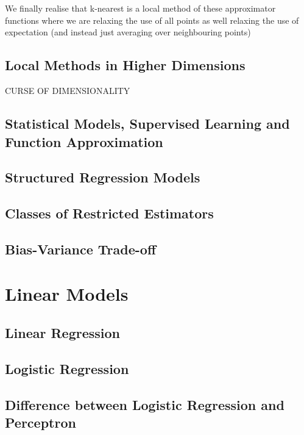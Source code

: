 \documentclass[12pt]{article}
\begin{document}
\\ \\
We finally realise that k-nearest is a local method of these approximator functions where we are relaxing the use of all points as well relaxing the use of expectation (and instead just averaging over neighbouring points) 

\subsection{Local Methods in Higher Dimensions}
CURSE OF DIMENSIONALITY
\subsection{Statistical Models, Supervised Learning and Function Approximation}
\subsection{Structured Regression Models}
\subsection{Classes of Restricted Estimators}
\subsection{Bias-Variance Trade-off}




\newpage 


\section{Linear Models}
\subsection{Linear Regression}
\subsection{Logistic Regression}
\subsection{Difference between Logistic Regression and Perceptron}
\end{document}
